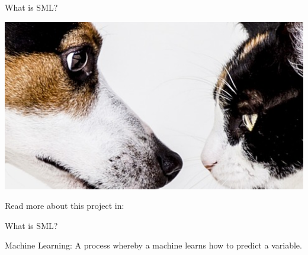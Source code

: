 \documentclass[handout]{beamer}
\begin{document}
\begin{frame}{What is SML?}
	
	\begin{center}
	\includegraphics{../pictures/dogvscat.png}
	\end{center}

	\begin{tiny}
		Read more about this project in: 
	\end{tiny}


	

\end{frame}

\begin{frame}{What is SML?} 
	
	Machine Learning: A process whereby a machine learns how to predict a variable.


\end{frame}
\end{document}
